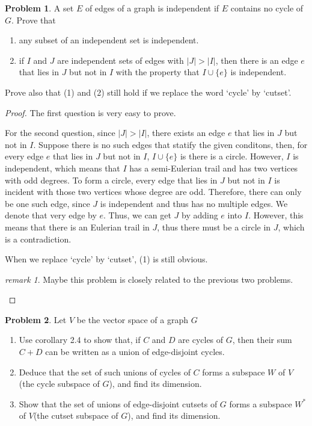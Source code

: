 \documentclass[a4paper,11pt]{article}%
\theoremstyle{remark}
\newtheorem*{remark}{remark}
\theoremstyle{definition}
\newtheorem{problem}{Problem}[subsection]
\newcommand*{\abs}[1]{\lvert #1 \rvert}
\begin{document}
\begin{problem}
    A set $E$ of edges of a graph is independent if $E$ contains no 
    cycle of $G$. Prove that 
    \begin{enumerate}
        \item any subset of an independent set is independent.
        \item if $I$ and $J$ are independent sets of edges with $\abs{J}>\abs{I}$,
        then there is an edge $e$ that lies in $J$ but not in $I$ with the 
        property that $I\cup\{e\}$ is independent.
    \end{enumerate}
    Prove also that (1) and (2) still hold if we replace the word `cycle' by `cutset'.
    \begin{proof}
        The first question is very easy to prove.

        For the second question, since $\abs{J}>\abs{I}$, there exists 
        an edge $e$ that lies in $J$ but not in $I$. Suppose there is no 
        such edges that statify the given conditons, then, for every edge $e$
         that lies in $J$ but not in $I$, $I\cup \{e\}$ is there is a circle.
         However, $I$ is independent, which means that $I$ has a semi-Eulerian
         trail and has two vertices with odd degrees. To form a circle, 
         every edge that lies in $J$ but not in $I$ is incident with those two 
         vertices whose degree are odd. Therefore, there can only be one such edge,
         since $J$ is independent and thus has no multiple edges. We denote that very
         edge by $e$. Thus, we can get $J$ by adding $e$ into $I$. However, 
         this means that there is an Eulerian trail in $J$, thus there must be 
         a circle in $J$, which is a contradiction.

        When we replace `cycle' by `cutset', (1) is still obvious.
        \begin{remark}
            Maybe this problem is closely related to the previous two problems.
        \end{remark}
    \end{proof}
\end{problem}
\begin{problem}
    Let $V$ be the vector space of a graph $G$
    \begin{enumerate}
        \item Use corollary 2.4 to show that, if $C$ and $D$ are cycles of $G$,
        then their sum $C+D$ can be written as a union of edge-disjoint cycles.
        \item Deduce that the set of such unions of cycles of $C$ forms a subspace $W$
        of $V$ (the cycle subspace of $G$), and find its dimension.
        \item Show that the set of unions of edge-disjoint cutsets of $G$ forms 
        a subspace $W^*$ of $V$(the cutset subspace of $G$), and  find its dimension.
    \end{enumerate}
\end{problem}
\end{document}
